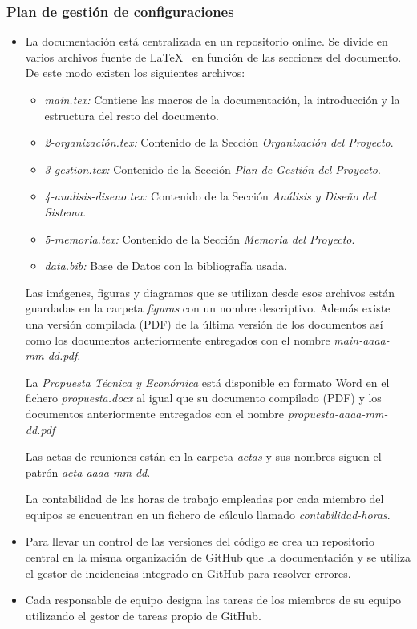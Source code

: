 \subsubsection{Plan de gestión de configuraciones}
\begin{itemize}
    \item La documentación está centralizada en un repositorio online. Se divide en varios archivos fuente de \LaTeX~ en función de las secciones del documento. De este modo existen los siguientes archivos:
		\begin{itemize}
			\item \textit{main.tex:} Contiene las macros de la documentación, la introducción y la estructura del resto del documento.
			\item \textit{2-organización.tex:} Contenido de la Sección \textit{Organización del Proyecto}.
			\item \textit{3-gestion.tex:} Contenido de la Sección \textit{Plan de Gestión del Proyecto}.
			\item \textit{4-analisis-diseno.tex:} Contenido de la Sección \textit{Análisis y Diseño del Sistema}.
			\item \textit{5-memoria.tex:} Contenido de la Sección \textit{Memoria del Proyecto}.
			\item \textit{data.bib:} Base de Datos con la bibliografía usada.
		\end{itemize}
		Las imágenes, figuras y diagramas que se utilizan desde esos archivos están guardadas en la carpeta \textit{figuras} con un nombre descriptivo. Además existe una versión compilada (PDF) de la última versión de los documentos así como los documentos anteriormente entregados con el nombre \textit{main-aaaa-mm-dd.pdf}.

		La \textit{Propuesta Técnica y Económica} está disponible en formato Word en el fichero \textit{propuesta.docx} al igual que su documento compilado (PDF) y los documentos anteriormente entregados con el nombre \textit{propuesta-aaaa-mm-dd.pdf}

		Las actas de reuniones están en la carpeta \textit{actas} y sus nombres siguen el patrón \textit{acta-aaaa-mm-dd}.

		La contabilidad de las horas de trabajo empleadas por cada miembro del equipos se encuentran en un fichero de cálculo llamado \textit{contabilidad-horas}.
 \item{ Para llevar un control de las versiones del código se crea un repositorio central en la misma organización de GitHub que la documentación y se utiliza el gestor de incidencias integrado en GitHub para resolver errores.}
\item{Cada responsable de equipo designa las tareas de los miembros de su equipo utilizando el gestor de tareas propio de GitHub. }


\end{itemize}
